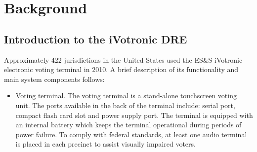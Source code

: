 \section{Background}

\subsection{Introduction to the iVotronic DRE}
Approximately 422 jurisdictions in the United States used the ES\&S iVotronic electronic voting terminal in 2010.  A brief description of  its functionality and main system components follows:

\begin{itemize} 
\item Voting terminal. The voting terminal is a stand-alone touchscreen voting  unit. The ports available in the back of the terminal include: serial port, compact flash card slot and power supply port. The terminal is equipped with an internal battery which keeps the terminal operational during periods of power failure. To comply with federal standards, at least one audio terminal is placed in each precinct to assist visually impaired voters.


\end{itemize}
